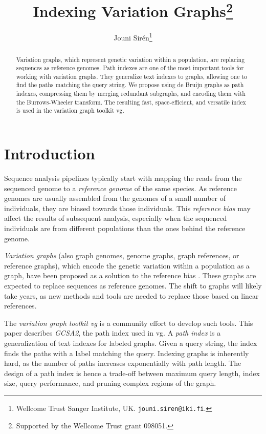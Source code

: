 \documentclass[twoside,leqno,twocolumn]{article}
\title{Indexing Variation Graphs\thanks{Supported by the Wellcome Trust grant 098051.}}
\author{Jouni Sirén\thanks{Wellcome Trust Sanger Institute, UK. \texttt{jouni.siren@iki.fi}.}}
\date{}
\begin{document}
\maketitle

\begin{abstract}\small\baselineskip=9pt
Variation graphs, which represent genetic variation within a population, are replacing sequences as reference genomes. Path indexes are one of the most important tools for working with variation graphs. They generalize text indexes to graphs, allowing one to find the paths matching the query string. We propose using de Bruijn graphs as path indexes, compressing them by merging redundant subgraphs, and encoding them with the Burrows-Wheeler transform. The resulting fast, space-efficient, and versatile index is used in the variation graph toolkit vg.
\end{abstract}


\section{Introduction}

Sequence analysis pipelines typically start with mapping the reads from the sequenced genome to a \emph{reference genome} of the same species. As reference genomes are usually assembled from the genomes of a small number of individuals, they are biased towards those individuals. This \emph{reference bias} may affect the results of subsequent analysis, especially when the sequenced individuals are from different populations than the ones behind the reference genome.

\emph{Variation graphs} (also graph genomes, genome graphs, graph references, or reference graphs), which encode the genetic variation within a population as a graph, have been proposed as a solution to the reference bias \cite{Paten2014,Marcus2014,Church2015,Dilthey2015,Marschall2016}. These graphs are expected to replace sequences as reference genomes. The shift to graphs will likely take years, as new methods and tools are needed to replace those based on linear references.

The \emph{variation graph toolkit vg} \cite{Garrison2014-2016} is a community effort to develop such tools. This paper describes \emph{GCSA2}, the path index used in vg. A \emph{path index} is a generalization of text indexes for labeled graphs. Given a query string, the index finds the paths with a label matching the query. Indexing graphs is inherently hard, as the number of paths increases exponentially with path length. The design of a path index is hence a trade-off between maximum query length, index size, query performance, and pruning complex regions of the graph.
\end{document}
